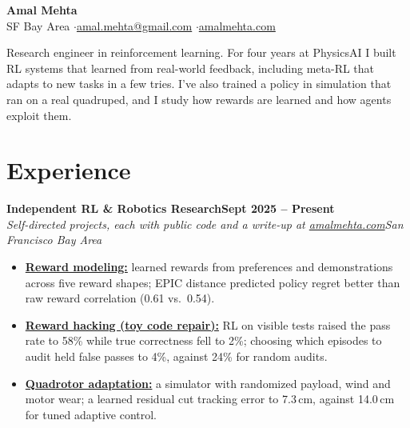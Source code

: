 \documentclass[10pt]{article}
\newcommand{\role}[4]{\par\vspace{5pt}\textbf{#1}\hfill\textbf{#2}\\\textit{#3}\hfill\textit{#4}}
\begin{document}
\fontsize{10}{12}\selectfont

\begin{center}
{\LARGE\bfseries Amal Mehta}\\[3pt]
SF Bay Area \quad$\cdot$\quad \href{mailto:amal.mehta@gmail.com}{amal.mehta@gmail.com} \quad$\cdot$\quad \href{https://amalmehta.com/}{amalmehta.com}
\end{center}

Research engineer in reinforcement learning. For four years at PhysicsAI I built RL systems that learned from real-world feedback, including meta-RL that adapts to new tasks in a few tries. I've also trained a policy in simulation that ran on a real quadruped, and I study how rewards are learned and how agents exploit them.

\section*{Experience}

\role{Independent RL \& Robotics Research}{Sept 2025 -- Present}{Self-directed projects, each with public code and a write-up at \href{https://amalmehta.com/}{amalmehta.com}}{San Francisco Bay Area}
\begin{itemize}
\item \href{https://amalmehta.com/RewardModeling/}{\textbf{Reward modeling:}} learned rewards from preferences and demonstrations across five reward shapes; EPIC distance predicted policy regret better than raw reward correlation (0.61 vs.\ 0.54).
\item \href{https://amalmehta.com/long_term_horizon_planning/}{\textbf{Reward hacking (toy code repair):}} RL on visible tests raised the pass rate to 58\% while true correctness fell to 2\%; choosing which episodes to audit held false passes to 4\%, against 24\% for random audits.
\item \href{https://amalmehta.com/DroneAutonomy/}{\textbf{Quadrotor adaptation:}} a simulator with randomized payload, wind and motor wear; a learned residual cut tracking error to 7.3\,cm, against 14.0\,cm for tuned adaptive control.
\end{itemize}
\end{document}
